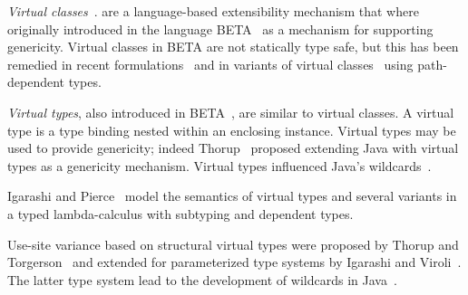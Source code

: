 {\em Virtual classes}~\cite{beta,mp89-virtual-classes,ernst06-virtual}.
are a language-based extensibility
mechanism that where
originally introduced in the language
BETA~\cite{beta} as a mechanism
for supporting genericity.
Virtual classes in BETA are not statically type safe, but this has been
remedied in recent formulations~\cite{ernst99-gbeta,ernst06-virtual} and in
variants of 
virtual classes~\cite{scala,nqm06,cdnw06-tribe,variant-path-types}
using path-dependent types.  

{\em Virtual types}, also introduced in BETA~\cite{beta},
are similar to virtual
classes.  A virtual type is a type binding nested within an
enclosing instance.
Virtual types
may be used to provide genericity; indeed
Thorup~\cite{thorup97} proposed extending Java with virtual types
as a genericity mechanism.  Virtual types influenced Java's 
wildcards~\cite{adding-wildcards,Java3,wildcards-safe}.

Igarashi and Pierce~\cite{ip99-virtual-types}
model the semantics of virtual types
and several variants
in a typed lambda-calculus with subtyping and dependent types.

Use-site variance based on 
structural virtual types
were proposed by Thorup and Torgerson~\cite{unifying-genericity}
and extended for parameterized type systems by Igarashi and
Viroli~\cite{variant-parametric-types}.  The latter type
system lead to the development of wildcards in
Java~\cite{Java3,adding-wildcards,wildcards-safe}.
